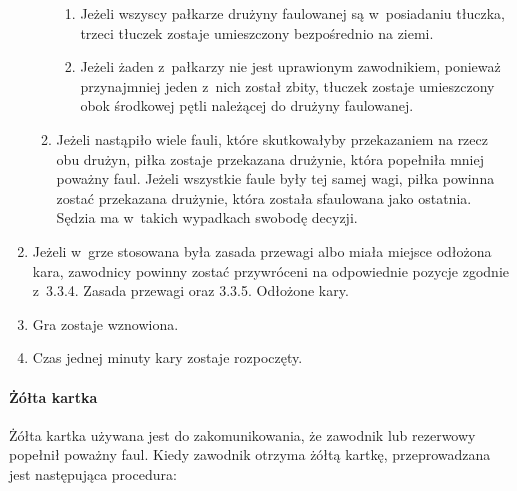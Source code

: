\documentclass[12pt,a4paper]{article}
\begin{document}
\begin{enumerate}
\begin{enumerate}
		            \begin{enumerate}
			            \item
			                  Jeżeli wszyscy pałkarze drużyny faulowanej są w~posiadaniu
			                  tłuczka, trzeci tłuczek zostaje umieszczony bezpośrednio na ziemi.
			            \item
			                  Jeżeli żaden z~pałkarzy nie jest uprawionym zawodnikiem, ponieważ
			                  przynajmniej jeden z~nich został zbity, tłuczek zostaje
			                  umieszczony obok środkowej pętli należącej do drużyny faulowanej.
		            \end{enumerate}
		      \item
		            Jeżeli nastąpiło wiele fauli, które skutkowałyby przekazaniem na
		            rzecz obu drużyn, piłka zostaje przekazana drużynie, która popełniła
		            mniej poważny faul. Jeżeli wszystkie faule były tej samej wagi,
		            piłka powinna zostać przekazana drużynie, która została sfaulowana
		            jako ostatnia. Sędzia ma w~takich wypadkach swobodę decyzji.
	      \end{enumerate}
	\item
	      Jeżeli w~grze stosowana była zasada przewagi albo miała miejsce
	      odłożona kara, zawodnicy powinny zostać przywróceni na odpowiednie
	      pozycje zgodnie z~3.3.4. Zasada przewagi oraz 3.3.5. Odłożone kary.
	\item
	      Gra zostaje wznowiona.
	\item
	      Czas jednej minuty kary zostaje rozpoczęty.
\end{enumerate}

\paragraph{Żółta kartka}
Żółta kartka używana jest do
zakomunikowania, że zawodnik lub rezerwowy popełnił poważny faul. Kiedy
zawodnik otrzyma żółtą kartkę, przeprowadzana jest następująca
procedura:
\end{document}
